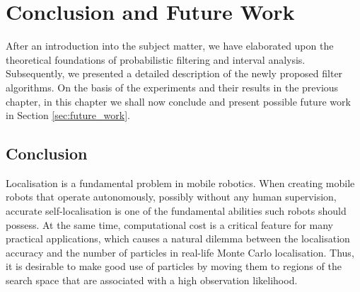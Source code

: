\chapter{Conclusion and Future Work}\label{ch:Conclusion and Future Work}

After an introduction into the subject matter, we have elaborated upon the theoretical foundations of probabilistic filtering and interval analysis. Subsequently, we presented a detailed description of the newly proposed filter algorithms. On the basis of the experiments and their results in the previous chapter, in this chapter we shall now conclude and present possible future work in Section \ref{sec:future_work}.


\section{Conclusion}

Localisation is a fundamental problem in mobile robotics. When creating mobile robots that operate autonomously, possibly without any human supervision, accurate self-localisation is one of the fundamental abilities such robots should possess. At the same time, computational cost is a critical feature for many practical applications, which causes a natural dilemma between the localisation accuracy and the number of particles in real-life Monte Carlo localisation. Thus, it is desirable to make good use of particles by moving them to regions of the search space that are associated with a high observation likelihood. 







